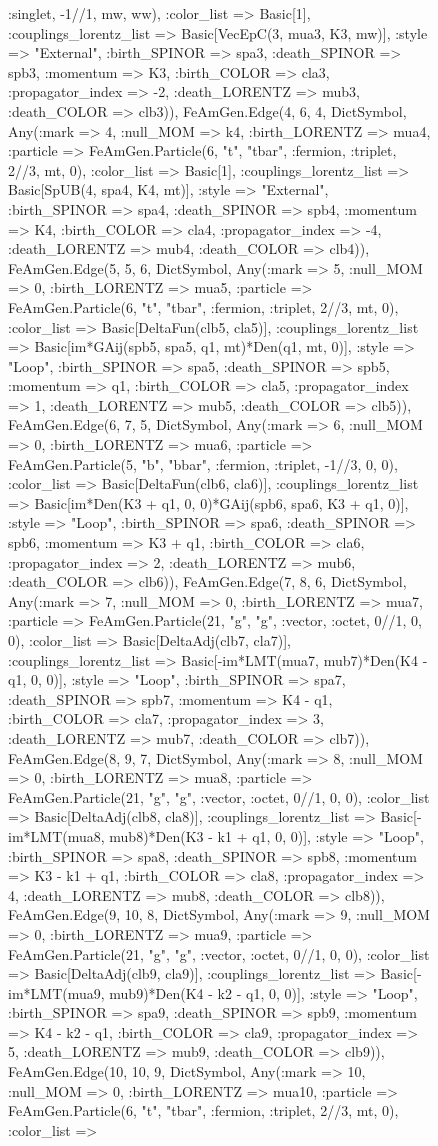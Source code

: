 \documentclass{revtex4}
\begin{document}
\begin{figure}[!htb]
\begin{center}
{:singlet, -1//1, mw, ww), :color_list => Basic[1], :couplings_lorentz_list => Basic[VecEpC(3, mua3, K3, mw)], :style => "External", :birth_SPINOR => spa3, :death_SPINOR => spb3, :momentum => K3, :birth_COLOR => cla3, :propagator_index => -2, :death_LORENTZ => mub3, :death_COLOR => clb3)), FeAmGen.Edge(4, 6, 4, Dict{Symbol, Any}(:mark => 4, :null_MOM => k4, :birth_LORENTZ => mua4, :particle => FeAmGen.Particle(6, "t", "tbar", :fermion, :triplet, 2//3, mt, 0), :color_list => Basic[1], :couplings_lorentz_list => Basic[SpUB(4, spa4, K4, mt)], :style => "External", :birth_SPINOR => spa4, :death_SPINOR => spb4, :momentum => K4, :birth_COLOR => cla4, :propagator_index => -4, :death_LORENTZ => mub4, :death_COLOR => clb4)), FeAmGen.Edge(5, 5, 6, Dict{Symbol, Any}(:mark => 5, :null_MOM => 0, :birth_LORENTZ => mua5, :particle => FeAmGen.Particle(6, "t", "tbar", :fermion, :triplet, 2//3, mt, 0), :color_list => Basic[DeltaFun(clb5, cla5)], :couplings_lorentz_list => Basic[im*GAij(spb5, spa5, q1, mt)*Den(q1, mt, 0)], :style => "Loop", :birth_SPINOR => spa5, :death_SPINOR => spb5, :momentum => q1, :birth_COLOR => cla5, :propagator_index => 1, :death_LORENTZ => mub5, :death_COLOR => clb5)), FeAmGen.Edge(6, 7, 5, Dict{Symbol, Any}(:mark => 6, :null_MOM => 0, :birth_LORENTZ => mua6, :particle => FeAmGen.Particle(5, "b", "bbar", :fermion, :triplet, -1//3, 0, 0), :color_list => Basic[DeltaFun(clb6, cla6)], :couplings_lorentz_list => Basic[im*Den(K3 + q1, 0, 0)*GAij(spb6, spa6, K3 + q1, 0)], :style => "Loop", :birth_SPINOR => spa6, :death_SPINOR => spb6, :momentum => K3 + q1, :birth_COLOR => cla6, :propagator_index => 2, :death_LORENTZ => mub6, :death_COLOR => clb6)), FeAmGen.Edge(7, 8, 6, Dict{Symbol, Any}(:mark => 7, :null_MOM => 0, :birth_LORENTZ => mua7, :particle => FeAmGen.Particle(21, "g", "g", :vector, :octet, 0//1, 0, 0), :color_list => Basic[DeltaAdj(clb7, cla7)], :couplings_lorentz_list => Basic[-im*LMT(mua7, mub7)*Den(K4 - q1, 0, 0)], :style => "Loop", :birth_SPINOR => spa7, :death_SPINOR => spb7, :momentum => K4 - q1, :birth_COLOR => cla7, :propagator_index => 3, :death_LORENTZ => mub7, :death_COLOR => clb7)), FeAmGen.Edge(8, 9, 7, Dict{Symbol, Any}(:mark => 8, :null_MOM => 0, :birth_LORENTZ => mua8, :particle => FeAmGen.Particle(21, "g", "g", :vector, :octet, 0//1, 0, 0), :color_list => Basic[DeltaAdj(clb8, cla8)], :couplings_lorentz_list => Basic[-im*LMT(mua8, mub8)*Den(K3 - k1 + q1, 0, 0)], :style => "Loop", :birth_SPINOR => spa8, :death_SPINOR => spb8, :momentum => K3 - k1 + q1, :birth_COLOR => cla8, :propagator_index => 4, :death_LORENTZ => mub8, :death_COLOR => clb8)), FeAmGen.Edge(9, 10, 8, Dict{Symbol, Any}(:mark => 9, :null_MOM => 0, :birth_LORENTZ => mua9, :particle => FeAmGen.Particle(21, "g", "g", :vector, :octet, 0//1, 0, 0), :color_list => Basic[DeltaAdj(clb9, cla9)], :couplings_lorentz_list => Basic[-im*LMT(mua9, mub9)*Den(K4 - k2 - q1, 0, 0)], :style => "Loop", :birth_SPINOR => spa9, :death_SPINOR => spb9, :momentum => K4 - k2 - q1, :birth_COLOR => cla9, :propagator_index => 5, :death_LORENTZ => mub9, :death_COLOR => clb9)), FeAmGen.Edge(10, 10, 9, Dict{Symbol, Any}(:mark => 10, :null_MOM => 0, :birth_LORENTZ => mua10, :particle => FeAmGen.Particle(6, "t", "tbar", :fermion, :triplet, 2//3, mt, 0), :color_list => }
\end{center}
\end{figure}
\end{document}
